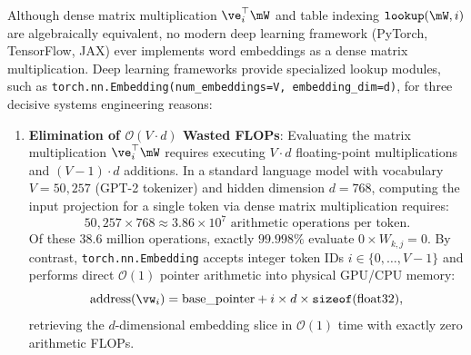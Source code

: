 \documentclass[../../main.tex]{subfiles}
\begin{document}
Although dense matrix multiplication $\ve_i^\top \mW$ and table indexing $\text{\texttt{lookup}}(\mW, i)$ are algebraically equivalent, no modern deep learning framework (PyTorch, TensorFlow, JAX) ever implements word embeddings as a dense matrix multiplication. Deep learning frameworks provide specialized lookup modules, such as \texttt{torch.nn.Embedding(num\_embeddings=V, embedding\_dim=d)}, for three decisive systems engineering reasons:

\begin{enumerate}
    \item \textbf{Elimination of $\mathcal{O}(V \cdot d)$ Wasted FLOPs}:
    Evaluating the matrix multiplication $\ve_i^\top \mW$ requires executing $V \cdot d$ floating-point multiplications and $(V-1) \cdot d$ additions. In a standard language model with vocabulary $V = 50{,}257$ (GPT-2 tokenizer) and hidden dimension $d = 768$, computing the input projection for a single token via dense matrix multiplication requires:
    \begin{equation}
    \label{eq:flops_wasted}
    50{,}257 \times 768 \approx 3.86 \times 10^7 \text{ arithmetic operations per token}.
    \end{equation}
    Of these $38.6$ million operations, exactly $99.998\%$ evaluate $0 \times W_{k, j} = 0$. By contrast, \texttt{torch.nn.Embedding} accepts integer token IDs $i \in \{0, \dots, V-1\}$ and performs direct $\mathcal{O}(1)$ pointer arithmetic into physical GPU/CPU memory:
    \begin{equation}
    \label{eq:pointer_arithmetic}
    \text{address}(\vw_i) = \text{base\_pointer} + i \times d \times \text{\texttt{sizeof}}(\text{float32}),
    \end{equation}
    retrieving the $d$-dimensional embedding slice in $\mathcal{O}(1)$ time with exactly zero arithmetic FLOPs.


\end{enumerate}
\end{document}
